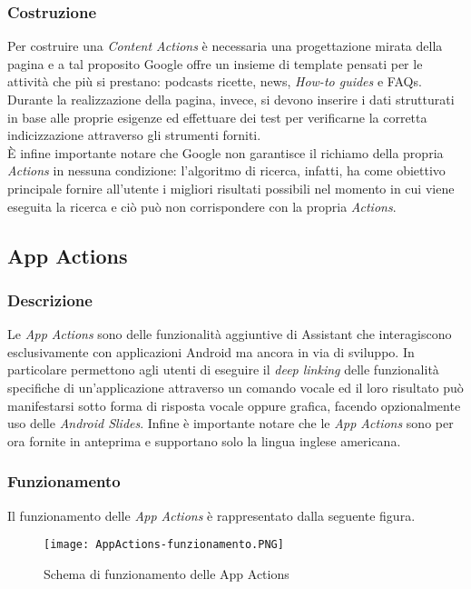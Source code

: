		\subsubsection{Costruzione}
		Per costruire una \emph{Content Actions} è necessaria una progettazione mirata della pagina e a tal proposito Google offre un insieme di template pensati per le attività che più si prestano: podcasts ricette, news, \emph{How-to guides} e FAQs. \\
		Durante la realizzazione della pagina, invece, si devono inserire i dati strutturati in base alle proprie esigenze ed effettuare dei test per verificarne la corretta indicizzazione attraverso gli strumenti forniti. \\
		È infine importante notare che Google non garantisce il richiamo della propria \emph{Actions} in nessuna condizione: l'algoritmo di ricerca, infatti, ha come obiettivo principale fornire all'utente i migliori risultati possibili nel momento in cui viene eseguita la ricerca e ciò può non corrispondere con la propria \emph{Actions}.
	\subsection{App Actions}
		\subsubsection{Descrizione}
		Le \emph{App Actions} sono delle funzionalità aggiuntive di Assistant che interagiscono esclusivamente con applicazioni Android ma ancora in via di sviluppo. In particolare permettono agli utenti di eseguire il \emph{deep linking} delle funzionalità specifiche di un'applicazione attraverso un comando vocale ed il loro risultato può manifestarsi sotto forma di risposta vocale oppure grafica, facendo opzionalmente uso delle \emph{Android Slides}.
		Infine è importante notare che le \emph{App Actions} sono per ora fornite in anteprima e supportano solo la lingua inglese americana.
		\subsubsection{Funzionamento}
		Il funzionamento delle \emph{App Actions} è rappresentato dalla seguente figura.
		
		\begin{figure}[htbp]
			\begin{center}
				\texttt{[image: AppActions-funzionamento.PNG]}
				\caption{Schema di funzionamento delle App Actions}
			\end{center}
		\end{figure}
		
